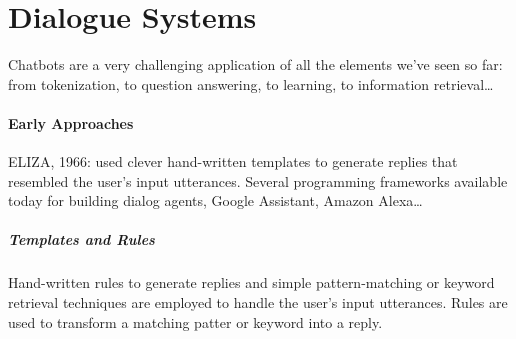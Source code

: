 \documentclass[10pt]{report}
\begin{document}
\section{Dialogue Systems}
Chatbots are a very challenging application of all the elements we've seen so far: from tokenization, to question answering, to learning, to information retrieval\ldots
\paragraph{Early Approaches} ELIZA, 1966: used clever hand-written templates to generate replies that resembled the user's input utterances. Several programming frameworks available today for building dialog agents, Google Assistant, Amazon Alexa\ldots
\subparagraph{Templates and Rules} Hand-written rules to generate replies and simple pattern-matching or keyword retrieval techniques are employed to handle the user's input utterances. Rules are used to transform a matching patter or keyword into a reply.
\end{document}

